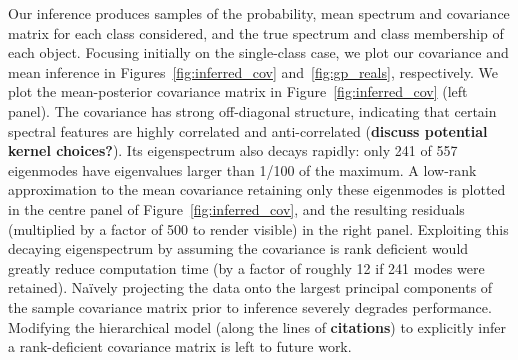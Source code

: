 \documentclass[a4paper,fleqn,usenatbib]{mnras}
\begin{document}
Our inference produces samples of the probability, mean spectrum and covariance matrix for each class considered, and the true spectrum and class membership of each object. Focusing initially on the single-class case, we plot our covariance and mean inference in Figures~\ref{fig:inferred_cov} and~\ref{fig:gp_reals}, respectively. We plot the mean-posterior covariance matrix in Figure~\ref{fig:inferred_cov} (left panel). The covariance has strong off-diagonal structure, indicating that certain spectral features are highly correlated and anti-correlated ({\bf discuss potential kernel choices?}). Its eigenspectrum also decays rapidly: only 241 of 557 eigenmodes have eigenvalues larger than 1/100 of the maximum. A low-rank approximation to the mean covariance retaining only these eigenmodes is plotted in the centre panel of Figure~\ref{fig:inferred_cov}, and the resulting residuals (multiplied by a factor of 500 to render visible) in the right panel. Exploiting this decaying eigenspectrum by assuming the covariance is rank deficient would greatly reduce computation time (by a factor of roughly 12 if 241 modes were retained). Na\"ively projecting the data onto the largest principal components of the sample covariance matrix prior to inference severely degrades performance. Modifying the hierarchical model (along the lines of {\bf citations}) to explicitly infer a rank-deficient covariance matrix is left to future work.
\end{document}

